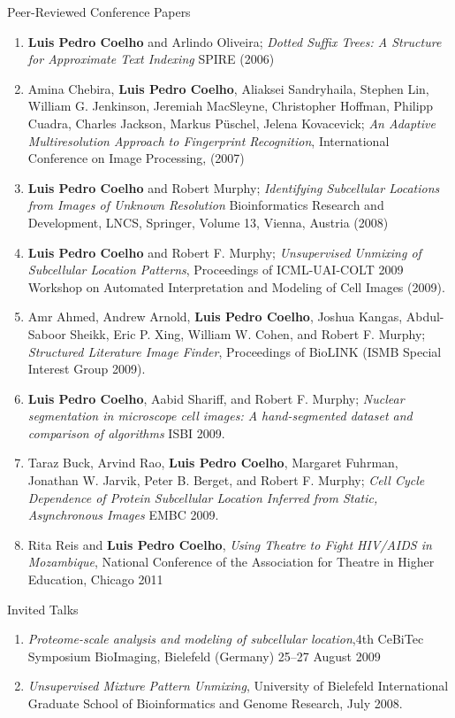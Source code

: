 \documentclass{article}
\renewcommand\subsection[1]{%
    \par\vspace{.1em}%
    {\hspace{1em}\subsubhead #1}%
    \par\vspace{.2em}%
}
\begin{document}
\subsection{Peer-Reviewed Conference Papers}
\begin{enumerate}
\item \textbf{Luis Pedro Coelho} and Arlindo Oliveira; \emph{Dotted Suffix
Trees: A Structure for Approximate Text Indexing} SPIRE (2006)
\item Amina Chebira, \textbf{Luis Pedro Coelho}, Aliaksei Sandryhaila, Stephen
Lin, William G. Jenkinson, Jeremiah MacSleyne, Christopher Hoffman, Philipp
Cuadra, Charles Jackson, Markus P\"uschel, Jelena Kovacevick; \emph{An Adaptive
Multiresolution Approach to Fingerprint Recognition}, International Conference
on Image Processing, (2007)
\item \textbf{Luis Pedro Coelho} and Robert Murphy; \emph{Identifying
Subcellular Locations from Images of Unknown Resolution} Bioinformatics
Research and Development, LNCS, Springer, Volume 13, Vienna, Austria (2008)
\item \textbf{Luis Pedro Coelho} and Robert F. Murphy; \emph{Unsupervised
Unmixing of Subcellular Location Patterns}, Proceedings of ICML-UAI-COLT 2009
Workshop on Automated Interpretation and Modeling of Cell Images (2009).
\item Amr Ahmed, Andrew Arnold, \textbf{Luis Pedro Coelho}, Joshua Kangas,
Abdul-Saboor Sheikk, Eric P. Xing, William W. Cohen, and Robert F. Murphy;
\emph{Structured Literature Image Finder}, Proceedings of BioLINK (ISMB Special
Interest Group 2009).
\item \textbf{Luis Pedro Coelho}, Aabid Shariff, and Robert F. Murphy;
\emph{Nuclear segmentation in microscope cell images: A hand-segmented dataset
and comparison of algorithms} ISBI 2009.
\item Taraz Buck, Arvind Rao, \textbf{Luis Pedro Coelho}, Margaret Fuhrman,
Jonathan W. Jarvik, Peter B. Berget, and Robert F. Murphy; \emph{Cell Cycle
Dependence of Protein Subcellular Location Inferred from Static, Asynchronous
Images} EMBC 2009.
\item Rita Reis and \textbf{Luis Pedro Coelho}, \emph{Using Theatre to Fight
HIV/AIDS in Mozambique}, National Conference of the Association for Theatre in
Higher Education, Chicago 2011
\end{enumerate}


\subsection{Invited Talks}
\begin{enumerate}
\item \emph{Proteome-scale analysis and modeling of subcellular location},4th
CeBiTec Symposium BioImaging, Bielefeld (Germany) 25--27 August 2009
\item \emph{Unsupervised Mixture Pattern Unmixing}, University of Bielefeld
International Graduate School of Bioinformatics and Genome Research, July 2008.
\end{enumerate}
\end{document}
